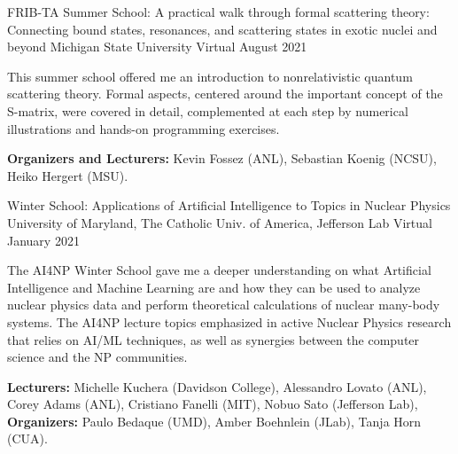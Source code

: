 

\begin{cventries}

  \cventry
    {FRIB-TA Summer School: A practical walk through formal scattering theory: Connecting bound states, resonances, and scattering states in exotic nuclei and beyond} %
    {Michigan State University} %
    {Virtual} %
    {August 2021} %
    {
      \begin{cvitems} %
        \item {This summer school offered me an introduction to nonrelativistic quantum scattering theory. Formal aspects, centered around the important concept of the S-matrix, were covered in detail, complemented at each step by numerical illustrations and hands-on programming exercises.}
        \item {\textbf{Organizers and Lecturers:} Kevin Fossez (ANL), Sebastian Koenig (NCSU), Heiko Hergert (MSU).}
      \end{cvitems}
    }

  \cventry
    {Winter School: Applications of Artificial Intelligence to Topics in Nuclear Physics} %
    {University of Maryland, The Catholic Univ. of America, Jefferson Lab} %
    {Virtual} %
    {January 2021} %
    {
      \begin{cvitems} %
        \item {The AI4NP Winter School gave me a deeper understanding on what Artificial Intelligence and Machine Learning are and how they can be used to analyze nuclear physics data and perform theoretical calculations of nuclear many-body systems. The AI4NP lecture topics emphasized in active Nuclear Physics research that relies on AI/ML techniques, as well as synergies between the computer science and the NP communities.}
        \item {\textbf{Lecturers:} Michelle Kuchera (Davidson College), Alessandro Lovato (ANL), Corey Adams (ANL), Cristiano Fanelli (MIT), Nobuo Sato (Jefferson Lab), \textbf{Organizers:} Paulo Bedaque (UMD), Amber Boehnlein (JLab), Tanja Horn (CUA).}
      \end{cvitems}
    }


\end{cventries}
